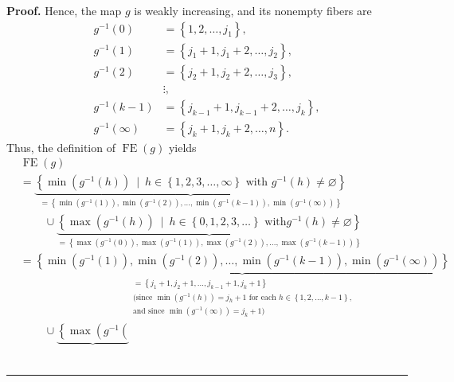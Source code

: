 \documentclass[numbers=enddot,12pt,final,onecolumn,notitlepage]{scrartcl}%
\theoremstyle{definition}
\newenvironment{proof}[1][Proof]{\noindent\textbf{#1.} }{\ \rule{0.5em}{0.5em}}
\newenvironment{verlong}{}{}
\begin{document}
\begin{verlong}
\begin{proof}
Hence, the map $g$ is weakly increasing, and its nonempty fibers are
\begin{align*}
g^{-1}\left(  0\right)   &  =\left\{  1,2,\ldots,j_{1}\right\}  ,\\
g^{-1}\left(  1\right)   &  =\left\{  j_{1}+1,j_{1}+2,\ldots,j_{2}\right\}
,\\
g^{-1}\left(  2\right)   &  =\left\{  j_{2}+1,j_{2}+2,\ldots,j_{3}\right\}
,\\
&  \vdots,\\
g^{-1}\left(  k-1\right)   &  =\left\{  j_{k-1}+1,j_{k-1}+2,\ldots
,j_{k}\right\}  ,\\
g^{-1}\left(  \infty\right)   &  =\left\{  j_{k}+1,j_{k}+2,\ldots,n\right\}  .
\end{align*}
Thus, the definition of $\operatorname*{FE}\left(  g\right)  $ yields%
\begin{align*}
&  \operatorname*{FE}\left(  g\right) \\
&  =\underbrace{\left\{  \min\left(  g^{-1}\left(  h\right)  \right)
\ \mid\ h\in\left\{  1,2,3,\ldots,\infty\right\}  \text{ with }g^{-1}\left(
h\right)  \neq\varnothing\right\}  }_{=\left\{  \min\left(  g^{-1}\left(
1\right)  \right)  ,\min\left(  g^{-1}\left(  2\right)  \right)  ,\ldots
,\min\left(  g^{-1}\left(  k-1\right)  \right)  ,\min\left(  g^{-1}\left(
\infty\right)  \right)  \right\}  }\\
&  \ \ \ \ \ \ \ \ \ \ \cup\underbrace{\left\{  \max\left(  g^{-1}\left(
h\right)  \right)  \ \mid\ h\in\left\{  0,1,2,3,\ldots\right\}  \text{ with
}g^{-1}\left(  h\right)  \neq\varnothing\right\}  }_{=\left\{  \max\left(
g^{-1}\left(  0\right)  \right)  ,\max\left(  g^{-1}\left(  1\right)  \right)
,\max\left(  g^{-1}\left(  2\right)  \right)  ,\ldots,\max\left(
g^{-1}\left(  k-1\right)  \right)  \right\}  }\\
&  =\underbrace{\left\{  \min\left(  g^{-1}\left(  1\right)  \right)
,\min\left(  g^{-1}\left(  2\right)  \right)  ,\ldots,\min\left(
g^{-1}\left(  k-1\right)  \right)  ,\min\left(  g^{-1}\left(  \infty\right)
\right)  \right\}  }_{\substack{=\left\{  j_{1}+1,j_{2}+1,\ldots
,j_{k-1}+1,j_{k}+1\right\}  \\\text{(since }\min\left(  g^{-1}\left(
h\right)  \right)  =j_{h}+1\text{ for each }h\in\left\{  1,2,\ldots
,k-1\right\}  \text{,}\\\text{and since }\min\left(  g^{-1}\left(
\infty\right)  \right)  =j_{k}+1\text{)}}}\\
&  \ \ \ \ \ \ \ \ \ \ \cup\underbrace{\left\{  \max\left(  g^{-1}\left(
}
\end{align*}
\end{proof}
\end{verlong}
\end{document}
